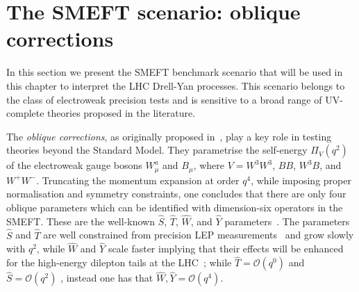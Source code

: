 \documentclass[withindex,glossary]{cam-thesis}
\begin{document}
\section{The SMEFT scenario: oblique corrections}
\label{sec:dy_scenarios}

In this section we present the SMEFT benchmark scenario that will be
used in this chapter to interpret the LHC Drell-Yan processes. This 
scenario belongs to the class of electroweak precision tests and is
sensitive to a broad range of UV-complete theories proposed in the literature.

The \textit{oblique corrections}, as originally proposed in~\cite{Peskin:1991sw,Altarelli:1991fk}, play a key role in testing theories beyond the Standard Model. They parametrise the self-energy $\Pi_V(q^2)$ of the electroweak gauge bosons $W^a_\mu$ and $B_\mu$,  where $V = W^3 W^3$, $B B$, $W^3 B$, and $W^+ W^-$.
%
Truncating the momentum expansion at order $q^4$, while imposing proper normalisation and symmetry constraints, one concludes that there are only four oblique
parameters which can be identified with dimension-six operators in the SMEFT.
%
These are the well-known  $\hat{S}$, $\hat{T}$, $\hat{W}$, and $\hat{Y}$
parameters~\cite{Barbieri:2004qk}.
%
The parameters $\hat{S}$ and $\hat{T}$ are well constrained from precision
LEP measurements~\cite{Barbieri:2004qk} and grow slowly with $q^2$,
while $\hat{W}$ and $\hat{Y}$ scale faster implying that their effects will be
enhanced for the high-energy dilepton tails at the LHC~\cite{Farina:2016rws}; 
while $\hat{T} = {\mathcal O}(q^0)$ and $\hat{S} = {\mathcal O}(q^2)$ ,
instead one has that $\hat{W},\hat{Y} = {\mathcal O}(q^4)$.
%
%
\end{document}
